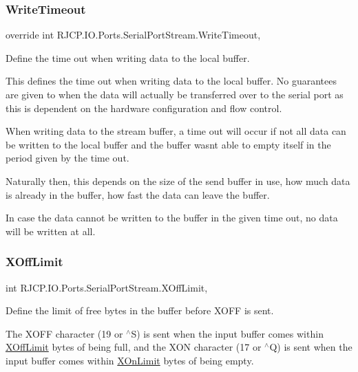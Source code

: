 \subsubsection{\texorpdfstring{WriteTimeout}{WriteTimeout}}
{\footnotesize\ttfamily override int R\+J\+C\+P.\+I\+O.\+Ports.\+Serial\+Port\+Stream.\+Write\+Timeout\hspace{0.3cm}{\ttfamily [get]}, {\ttfamily [set]}}



Define the time out when writing data to the local buffer. 

This defines the time out when writing data to the local buffer. No guarantees are given to when the data will actually be transferred over to the serial port as this is dependent on the hardware configuration and flow control. 

When writing data to the stream buffer, a time out will occur if not all data can be written to the local buffer and the buffer wasn\textquotesingle{}t able to empty itself in the period given by the time out.

Naturally then, this depends on the size of the send buffer in use, how much data is already in the buffer, how fast the data can leave the buffer.

In case the data cannot be written to the buffer in the given time out, no data will be written at all.\mbox{\label{class_r_j_c_p_1_1_i_o_1_1_ports_1_1_serial_port_stream_a788b734b7f7ae0ea73d3d87ddefccb16}} 
\subsubsection{\texorpdfstring{XOffLimit}{XOffLimit}}
{\footnotesize\ttfamily int R\+J\+C\+P.\+I\+O.\+Ports.\+Serial\+Port\+Stream.\+X\+Off\+Limit\hspace{0.3cm}{\ttfamily [get]}, {\ttfamily [set]}}



Define the limit of free bytes in the buffer before X\+O\+FF is sent. 

The X\+O\+FF character (19 or $^\wedge$S) is sent when the input buffer comes within \mbox{\hyperlink{class_r_j_c_p_1_1_i_o_1_1_ports_1_1_serial_port_stream_a788b734b7f7ae0ea73d3d87ddefccb16}{X\+Off\+Limit}} bytes of being full, and the X\+ON character (17 or $^\wedge$Q) is sent when the input buffer comes within \mbox{\hyperlink{class_r_j_c_p_1_1_i_o_1_1_ports_1_1_serial_port_stream_a9c35bb6f9e65e8a909f7148e6dbcde54}{X\+On\+Limit}} bytes of being empty. \mbox{\label{class_r_j_c_p_1_1_i_o_1_1_ports_1_1_serial_port_stream_a9c35bb6f9e65e8a909f7148e6dbcde54}} 
